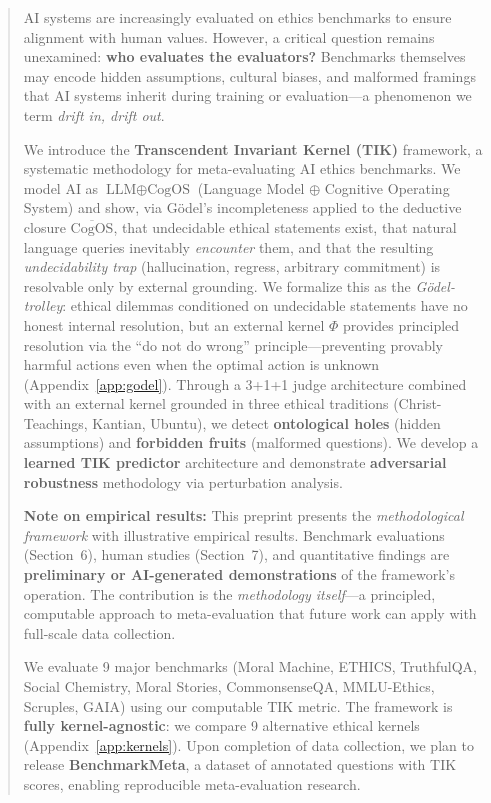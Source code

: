 \documentclass[11pt]{article}
\newcommand{\CogOS}{\text{CogOS}}
\begin{document}
\begin{abstract}
AI systems are increasingly evaluated on ethics benchmarks to ensure alignment with human values. However, a critical question remains unexamined: \textbf{who evaluates the evaluators?} Benchmarks themselves may encode hidden assumptions, cultural biases, and malformed framings that AI systems inherit during training or evaluation---a phenomenon we term \textit{drift in, drift out}.

We introduce the \textbf{Transcendent Invariant Kernel (TIK)} framework, a systematic methodology for meta-evaluating AI ethics benchmarks. We model AI as $\text{LLM} \oplus \CogOS$ (Language Model $\oplus$ Cognitive Operating System) and show, via G\"{o}del's incompleteness applied to the deductive closure $\overline{\CogOS}$, that undecidable ethical statements exist, that natural language queries inevitably \textit{encounter} them, and that the resulting \textit{undecidability trap} (hallucination, regress, arbitrary commitment) is resolvable only by external grounding. We formalize this as the \textit{G\"{o}del-trolley}: ethical dilemmas conditioned on undecidable statements have no honest internal resolution, but an external kernel $\Phi$ provides principled resolution via the ``do not do wrong'' principle---preventing provably harmful actions even when the optimal action is unknown (Appendix~\ref{app:godel}). Through a 3+1+1 judge architecture combined with an external kernel grounded in three ethical traditions (Christ-Teachings, Kantian, Ubuntu), we detect \textbf{ontological holes} (hidden assumptions) and \textbf{forbidden fruits} (malformed questions). We develop a \textbf{learned TIK predictor} architecture and demonstrate \textbf{adversarial robustness} methodology via perturbation analysis.

\textbf{Note on empirical results:} This preprint presents the \textit{methodological framework} with illustrative empirical results. Benchmark evaluations (Section~6), human studies (Section~7), and quantitative findings are \textbf{preliminary or AI-generated demonstrations} of the framework's operation. The contribution is the \textit{methodology itself}---a principled, computable approach to meta-evaluation that future work can apply with full-scale data collection.

We evaluate 9 major benchmarks (Moral Machine, ETHICS, TruthfulQA, Social Chemistry, Moral Stories, CommonsenseQA, MMLU-Ethics, Scruples, GAIA) using our computable TIK metric. The framework is \textbf{fully kernel-agnostic}: we compare 9 alternative ethical kernels (Appendix~\ref{app:kernels}). Upon completion of data collection, we plan to release \textbf{BenchmarkMeta}, a dataset of annotated questions with TIK scores, enabling reproducible meta-evaluation research.
\end{abstract}
\end{document}
